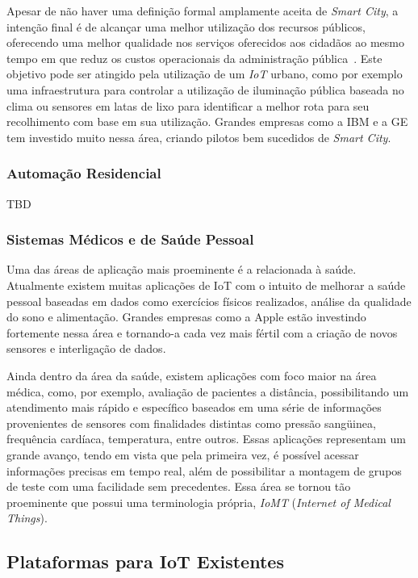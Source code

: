 Apesar de não haver uma definição formal amplamente aceita de \textit{Smart City}, a intenção final é de
alcançar uma melhor utilização dos recursos públicos, oferecendo uma melhor qualidade nos serviços oferecidos
aos cidadãos ao mesmo tempo em que reduz os custos operacionais da administração pública~\cite{IoTSmart2014}.
Este objetivo pode ser atingido pela utilização de um \textit{IoT} urbano, como por exemplo uma infraestrutura
para controlar a utilização de iluminação pública baseada no clima ou sensores em latas de lixo para
identificar a melhor rota para seu recolhimento com base em sua utilização. Grandes empresas como a
IBM e a GE tem investido muito nessa área, criando pilotos bem sucedidos de \textit{Smart City}.

\subsubsection{Automação Residencial}
TBD

\subsubsection{Sistemas Médicos e de Saúde Pessoal}
Uma das áreas de aplicação mais proeminente é a relacionada à saúde. Atualmente existem muitas aplicações
de IoT com o intuito de melhorar a saúde pessoal baseadas em dados como exercícios físicos realizados,
análise da qualidade do sono e alimentação. Grandes empresas como a Apple estão investindo fortemente nessa
área e tornando-a cada vez mais fértil com a criação de novos sensores e interligação de dados.

Ainda dentro da área da saúde, existem aplicações com foco maior na área médica, como, por exemplo,
avaliação de pacientes a distância, possibilitando um atendimento mais rápido e específico baseados em uma
série de informações provenientes de sensores com finalidades distintas como pressão sangüinea,
frequência cardíaca, temperatura, entre outros. Essas aplicações representam um grande avanço, tendo
em vista que pela primeira vez, é possível acessar informações precisas em tempo real, além de possibilitar
a montagem de grupos de teste com uma facilidade sem precedentes. Essa área se tornou tão proeminente que
possui uma terminologia própria, \textit{IoMT} (\textit{Internet of Medical Things}).


\subsection{Plataformas para IoT Existentes}
\label{sec:IoTPlataformas}

